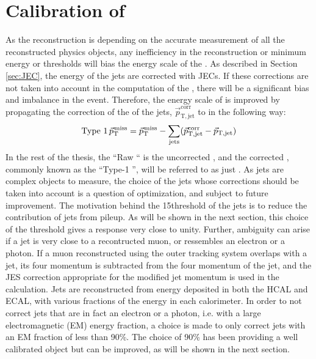 \section{Calibration of \ptmiss} 
\noindent
\justify
\label{sec:metcorrections}
As the \ptmiss reconstruction is depending on the accurate measurement of all the reconstructed physics objects, any inefficiency in the reconstruction or minimum energy or \pt thresholds will bias the energy scale of the \ptmiss. 
As described in Section \ref{sec:JEC}, the energy of the jets are corrected with JECs. 
If these corrections are not taken into account in the computation of the \ptmiss, there will be a significant bias and imbalance in the event. 
Therefore, the energy scale of \ptmiss is improved by propagating the correction of the \pt of the jets, $\vec{p}_\mathrm{T,jet}^\mathrm{corr}$ to \ptmiss in the following way:
\begin{equation}
\text{Type 1} \, {\vec p}_{\mathrm{T}}^{\kern1pt\text{miss}}
={\vec p}_{\mathrm{T}}^{\kern1pt\text{miss}} - \sum_\mathrm{jets} (\vec{p}_\mathrm{T,jet}^\mathrm{corr}-\vec{p}_\mathrm{T,jet})
\label{eq:Type1MET}
\end{equation}                                                                          
In the rest of the thesis, the ``Raw \ptmiss`` is the uncorrected \ptmiss, and the corrected \ptmiss, commonly known as the ``Type-1 \ptmiss'', will be referred to as just \ptmiss.
As jets are complex objects to measure, the choice of the jets whose corrections should be taken into account is a question of optimization, and subject to future improvement. 
The motivation behind the 15\GeV \pt threshold of the jets is to reduce the contribution of jets from pileup. 
As will be shown in the next section, this choice of the \pt threshold gives a response very close to unity. 
Further, ambiguity can arise if a jet is very close to a recontructed muon, or ressembles an electron or a photon. 
If a muon reconstructed using the outer tracking system overlaps with a jet, its four momentum is subtracted from the four momentum of the jet, and the JES correction appropriate for the modified jet momentum is used in the \ptmiss calculation. 
Jets are reconstructed from energy deposited in both the HCAL and ECAL, with various fractions of the energy in each calorimeter. 
In order to not correct jets that are in fact an electron or a photon, i.e. with a large electromagnetic (EM) energy fraction, a choice is made to only correct jets with an EM fraction of less than 90\%. 
The choice of 90\% has been providing a well calibrated \ptmiss object but can be improved, as will be shown in the next section.  
